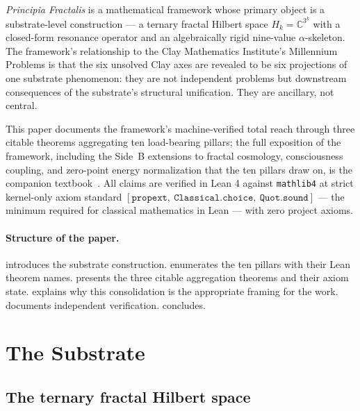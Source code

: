 \documentclass[11pt,a4paper]{article}
\theoremstyle{definition}
\begin{document}
\emph{Principia Fractalis} is a mathematical framework whose primary
object is a substrate-level construction --- a ternary fractal
Hilbert space $H_k = \mathbb{C}^{3^k}$ with a closed-form resonance
operator and an algebraically rigid nine-value $\alpha$-skeleton.
The framework's relationship to the Clay Mathematics Institute's
Millennium Problems is that the six unsolved Clay axes are revealed
to be six projections of one substrate phenomenon: they are not
independent problems but downstream consequences of the substrate's
structural unification. They are ancillary, not central.

This paper documents the framework's machine-verified total reach
through three citable theorems aggregating ten load-bearing pillars;
the full exposition of the framework, including the Side~B
extensions to fractal cosmology, consciousness coupling, and
zero-point energy normalization that the ten pillars draw on, is
the companion textbook~\cite{cohen2026textbook}.
All claims are verified in Lean 4 against \texttt{mathlib4} at
strict kernel-only axiom standard
$[\texttt{propext},\ \texttt{Classical.choice},\ \texttt{Quot.sound}]$
--- the minimum required for classical mathematics in Lean --- with
zero project axioms.

\paragraph{Structure of the paper.}  introduces
the substrate construction.  enumerates the
ten pillars with their Lean theorem names. 
presents the three citable aggregation theorems and their axiom
state.  explains why this consolidation
is the appropriate framing for the work. 
documents independent verification.  concludes.

\section{The Substrate}
\label{sec:substrate}

\subsection{The ternary fractal Hilbert space}
\end{document}
